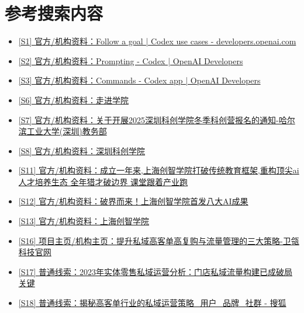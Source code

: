 \documentclass[UTF8,zihao=-4]{ctexart}
\begin{document}
\section*{参考搜索内容}
\begin{itemize}[leftmargin=2em]
\item \href{https://developers.openai.com/codex/use-cases/follow-goals}{[S1] 官方/机构资料：Follow a goal | Codex use cases - developers.openai.com}
\item \href{https://developers.openai.com/codex/prompting}{[S2] 官方/机构资料：Prompting - Codex | OpenAI Developers}
\item \href{https://developers.openai.com/codex/app/commands}{[S3] 官方/机构资料：Commands - Codex app | OpenAI Developers}
\item \href{https://innoxsz.com/explore-innox}{[S6] 官方/机构资料：走进学院}
\item \href{http://due.hitsz.edu.cn/info/1486/6195.htm}{[S7] 官方/机构资料：关于开展2025深圳科创学院冬季科创营报名的通知-哈尔滨工业大学(深圳)教务部}
\item \href{https://www.innoxsz.com/}{[S8] 官方/机构资料：深圳科创学院}
\item \href{https://www.ecnu.edu.cn/info/1426/70270.htm}{[S11] 官方/机构资料：成立一年来,上海创智学院打破传统教育框架,重构顶尖ai人才培养生态 全年猎才破边界 课堂跟着产业跑}
\item \href{https://www.sast.gov.cn/content.html?id=1949032550202621954&cid=36}{[S12] 官方/机构资料：破界而来！上海创智学院首发八大AI成果}
\item \href{https://www.sii.edu.cn/}{[S13] 官方/机构资料：上海创智学院}
\item \href{https://www.weiling.cn/info/tMMWt3aZ.html}{[S16] 项目主页/机构主页：提升私域高客单高复购与流量管理的三大策略-卫瓴科技官网}
\item \href{https://www.vzkoo.com/read/20250702636339fd321e457645743369.html}{[S17] 普通线索：2023年实体零售私域运营分析：门店私域流量构建已成破局关键}
\item \href{https://www.sohu.com/a/917190938_120405735}{[S18] 普通线索：揭秘高客单行业的私域运营策略\_用户\_品牌\_社群 - 搜狐}
\end{itemize}
\end{document}
